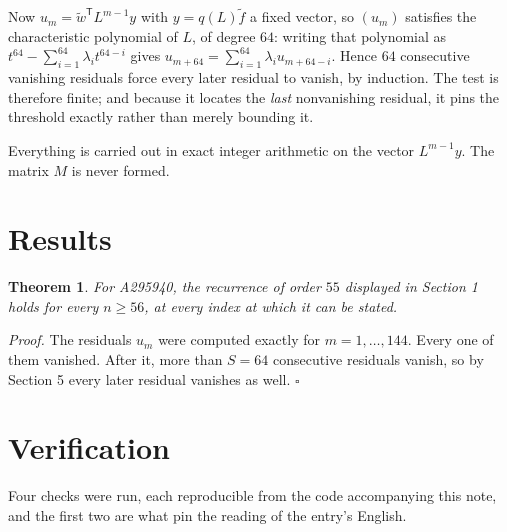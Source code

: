 \documentclass[11pt]{article}
\newtheorem{theorem}{Theorem}
\theoremstyle{definition}
\begin{document}
Now $u_m = \tilde w^{\mathsf T} L^{m-1} y$ with $y = q(L)\tilde f$ a fixed vector, so $(u_m)$ satisfies the characteristic polynomial of $L$, of degree $64$: writing that polynomial as $t^{64} - \sum_{i=1}^{64} \lambda_i t^{64-i}$ gives $u_{m+64} = \sum_{i=1}^{64} \lambda_i u_{m+64-i}$. Hence $64$ consecutive vanishing residuals force every later residual to vanish, by induction. The test is therefore finite; and because it locates the {\itshape last} nonvanishing residual, it pins the threshold exactly rather than merely bounding it.

Everything is carried out in exact integer arithmetic on the vector $L^{m-1}y$. The matrix $M$ is never formed.

\section{Results}

\begin{theorem} For A295940, the recurrence of order $55$ displayed in Section 1 holds for every $n \ge 56$, at every index at which it can be stated.\end{theorem}

{\itshape Proof.} The residuals $u_m$ were computed exactly for $m = 1,\dots,144$. Every one of them vanished. After it, more than $S = 64$ consecutive residuals vanish, so by Section 5 every later residual vanishes as well. $\square$

\section{Verification}

Four checks were run, each reproducible from the code accompanying this note, and the first two are what pin the reading of the entry's English.
\end{document}
